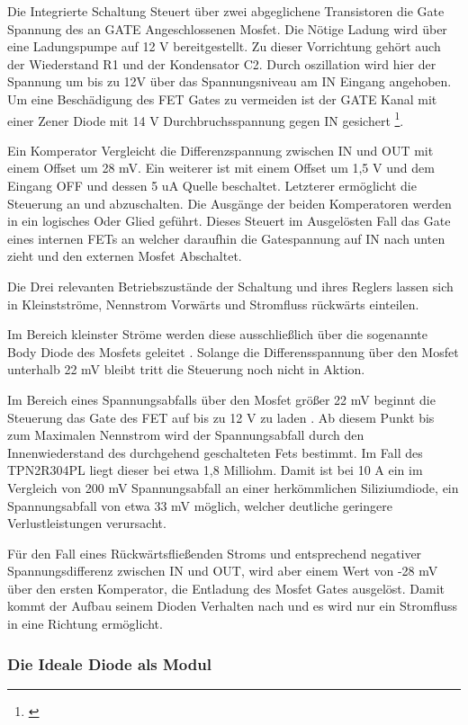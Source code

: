 Die Integrierte Schaltung Steuert über zwei abgeglichene Transistoren die Gate Spannung des an GATE Angeschlossenen Mosfet. Die Nötige Ladung wird über eine Ladungspumpe auf 12 V bereitgestellt. Zu dieser Vorrichtung gehört auch der Wiederstand R1 und der Kondensator C2.
Durch oszillation wird hier der Spannung um bis zu 12V  über das Spannungsniveau am IN Eingang angehoben. Um eine Beschädigung des FET Gates zu vermeiden ist der GATE Kanal mit einer Zener Diode mit 14 V Durchbruchsspannung gegen IN gesichert \footnote{\cite[Seite~12.]{LM5050-1}}.

Ein Komperator Vergleicht die Differenzspannung zwischen IN und OUT mit einem Offset um 28 mV. Ein weiterer ist mit einem Offset um 1,5 V und dem Eingang OFF und dessen 5 uA Quelle beschaltet. Letzterer ermöglicht die Steuerung an und abzuschalten. Die Ausgänge der beiden Komperatoren werden in ein logisches Oder Glied geführt. Dieses Steuert im Ausgelösten Fall das Gate eines internen FETs an welcher daraufhin die Gatespannung auf IN nach unten zieht und den externen Mosfet Abschaltet. 

Die Drei relevanten Betriebszustände der Schaltung und ihres Reglers lassen sich in Kleinstströme, Nennstrom Vorwärts und Stromfluss rückwärts einteilen.

Im Bereich kleinster Ströme werden diese ausschließlich über die sogenannte Body Diode des Mosfets geleitet \cite{Herberg2013}. Solange die Differensspannung über den Mosfet unterhalb 22 mV bleibt tritt die Steuerung noch nicht in Aktion.

Im Bereich eines Spannungsabfalls über den Mosfet größer 22 mV beginnt die Steuerung das Gate des FET auf bis zu 12 V zu laden \cite{LM5050-1}. Ab diesem Punkt bis zum Maximalen Nennstrom wird der Spannungsabfall durch den Innenwiederstand des durchgehend geschalteten Fets bestimmt. Im Fall des TPN2R304PL liegt dieser bei etwa 1,8 Milliohm. Damit ist bei 10 A ein im Vergleich von 200 mV Spannungsabfall an einer herkömmlichen Siliziumdiode, ein Spannungsabfall von etwa 33 mV möglich, welcher deutliche geringere Verlustleistungen verursacht.

Für den Fall eines Rückwärtsfließenden Stroms und entsprechend negativer Spannungsdifferenz zwischen IN und OUT, wird aber einem Wert von -28 mV über den ersten Komperator, die Entladung des Mosfet Gates ausgelöst. Damit kommt der Aufbau seinem Dioden Verhalten nach und es wird nur ein Stromfluss in eine Richtung ermöglicht.

\subsubsection{Die Ideale Diode als Modul}


